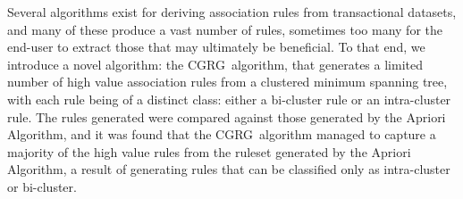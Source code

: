 \documentclass[paper=a4,fontsize=11pt]{report}	%
\newcommand{\algo}{CGRG}
\begin{document}
Several algorithms exist for deriving association rules from transactional datasets, and many of these produce a vast number of rules, sometimes too many for the end-user to extract those that may ultimately be beneficial.
To that end, we introduce a novel algorithm: the \algo\ algorithm, that generates a limited number of high value association rules from a clustered minimum spanning tree, with each rule being of a distinct class: either a bi-cluster rule or an intra-cluster rule. The rules generated were compared against those generated by the Apriori Algorithm, and it was found that the \algo\ algorithm managed to capture a majority of the high value rules from the ruleset generated by the Apriori Algorithm, a result of generating rules that can be classified only as intra-cluster or bi-cluster.

\newpage
\setcounter{page}{1}
\tableofcontents
\newpage

\setcounter{page}{1}		%

\pagestyle{fancy}
\fancyhf{}
\lhead{\leftmark}



\renewcommand*{\mkbibnamefamily}[1]{\textsc{\textbf{#1}}}
\renewcommand*{\mkbibnameprefix}[1]{\textsc{\textbf{#1}}}
\renewcommand*{\mkbibnamegiven}[1]{\textsc{\textbf{#1}}}
\renewcommand*{\mkbibnamesuffix}[1]{\textsc{\textbf{#1}}}
\printbibliography[heading=bibintoc, title=References]

\end{document}
